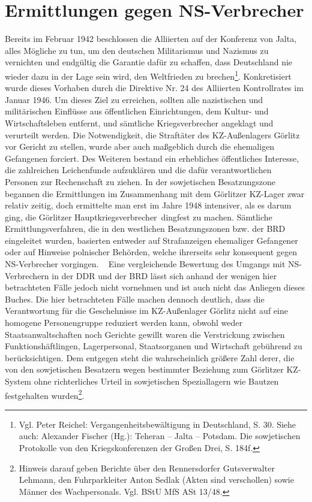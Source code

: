 \section{Ermittlungen gegen NS-Verbrecher\label{ns-verbrechen}}
Bereits im Februar 1942 beschlossen die Alliierten auf der Konferenz von Jalta, alles Mögliche zu tun, um \glqq den deutschen Militarismus und Nazismus zu vernichten und endgültig die Garantie dafür zu schaffen, dass Deutschland nie wieder dazu in der Lage sein wird, den Weltfrieden zu brechen\grqq\footnote{Vgl. Peter Reichel: Vergangenheitsbewältigung in Deutschland, S. 30. Siehe auch: Alexander Fischer (Hg.): Teheran -- Jalta -- Potsdam. Die sowjetischen Protokolle von den Kriegskonferenzen der Großen Drei, S. 184f.}. Konkretisiert wurde dieses Vorhaben durch die Direktive Nr. 24 des Alliierten Kontrollrates im Januar 1946.
Um dieses Ziel zu erreichen, sollten alle nazistischen und militärischen Einflüsse aus öffentlichen Einrichtungen, dem Kultur- und Wirtschaftsleben entfernt, und sämtliche Kriegsverbrecher angeklagt und verurteilt werden.
Die Notwendigkeit, die Straftäter des KZ-Außenlagers Görlitz vor Gericht zu stellen, wurde aber auch maßgeblich durch die ehemaligen Gefangenen forciert. Des Weiteren bestand ein erhebliches öffentliches Interesse, die zahlreichen Leichenfunde aufzuklären und die dafür verantwortlichen Personen zur Rechenschaft zu ziehen. 
In der sowjetischen Besatzungszone begannen die Ermittlungen im Zusammenhang mit dem Görlitzer KZ-Lager zwar relativ zeitig, doch ermittelte man erst im Jahre 1948 intensiver, als es darum ging, die Görlitzer \glqq Hauptkriegsverbrecher\grqq~dingfest zu machen. 
Sämtliche Ermittlungsverfahren, die in den westlichen Besatzungszonen bzw. der BRD eingeleitet wurden, basierten entweder auf Strafanzeigen ehemaliger Gefangener oder auf Hinweise polnischer Behörden, welche ihrerseits sehr konsequent gegen NS-Verbrecher vorgingen.
~\newline
Eine vergleichende Bewertung des Umgangs mit NS-Verbrechern in der DDR und der BRD lässt sich anhand der wenigen hier betrachteten Fälle jedoch nicht vornehmen und ist auch nicht das Anliegen dieses Buches. Die hier betrachteten Fälle machen dennoch deutlich, dass die Verantwortung für die Geschehnisse im KZ-Außenlager Görlitz nicht auf eine homogene Personengruppe reduziert werden kann, obwohl weder Staatsanwaltschaften noch Gerichte gewillt waren die Verstrickung zwischen Funktionshäftlingen, Lagerpersonal, Staatsorganen und Wirtschaft gebührend zu berücksichtigen. Dem entgegen steht die wahrscheinlich größere Zahl derer, die von den sowjetischen Besatzern wegen bestimmter Beziehung zum Görlitzer KZ-System ohne richterliches Urteil in sowjetischen Speziallagern wie Bautzen festgehalten wurden\footnote{Hinweis darauf geben Berichte über den Rennersdorfer Gutsverwalter Lehmann, den Fuhrparkleiter Anton Sedlak (Akten sind verschollen) sowie Männer des Wachpersonals. Vgl. BStU MfS ASt 13/48.}. 

